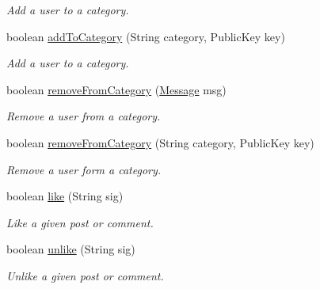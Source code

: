 \begin{DoxyCompactItemize}
\begin{DoxyCompactList}\small\item\em Add a user to a category. \end{DoxyCompactList}\item 
boolean \hyperlink{classballmerpeak_1_1turtlenet_1_1server_1_1Database_a92b3b3bea181888c22086688816738aa}{add\-To\-Category} (String category, Public\-Key key)
\begin{DoxyCompactList}\small\item\em Add a user to a category. \end{DoxyCompactList}\item 
boolean \hyperlink{classballmerpeak_1_1turtlenet_1_1server_1_1Database_a2718a68613d43dabf2c62bebc9f41e05}{remove\-From\-Category} (\hyperlink{classballmerpeak_1_1turtlenet_1_1shared_1_1Message}{Message} msg)
\begin{DoxyCompactList}\small\item\em Remove a user from a category. \end{DoxyCompactList}\item 
boolean \hyperlink{classballmerpeak_1_1turtlenet_1_1server_1_1Database_a25313e4d456741744541e8b42d7bef9b}{remove\-From\-Category} (String category, Public\-Key key)
\begin{DoxyCompactList}\small\item\em Remove a user form a category. \end{DoxyCompactList}\item 
boolean \hyperlink{classballmerpeak_1_1turtlenet_1_1server_1_1Database_ac2c2361722304a6446d5cd01cb0c5d3b}{like} (String sig)
\begin{DoxyCompactList}\small\item\em Like a given post or comment. \end{DoxyCompactList}\item 
boolean \hyperlink{classballmerpeak_1_1turtlenet_1_1server_1_1Database_a500911b2c3d32d456c2bf34a23747d85}{unlike} (String sig)
\begin{DoxyCompactList}\small\item\em Unlike a given post or comment. \end{DoxyCompactList}\end{DoxyCompactItemize}
